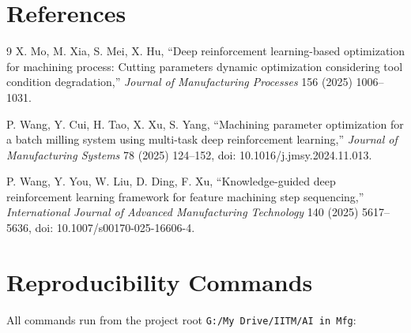 \documentclass[11pt,a4paper]{article}
\begin{document}
\section*{References}
\begin{thebibliography}{9}
X. Mo, M. Xia, S. Mei, X. Hu, ``Deep reinforcement learning-based optimization for machining process: Cutting parameters dynamic optimization considering tool condition degradation,'' \textit{Journal of Manufacturing Processes} 156 (2025) 1006--1031.

P. Wang, Y. Cui, H. Tao, X. Xu, S. Yang, ``Machining parameter optimization for a batch milling system using multi-task deep reinforcement learning,'' \textit{Journal of Manufacturing Systems} 78 (2025) 124--152, doi: 10.1016/j.jmsy.2024.11.013.

P. Wang, Y. You, W. Liu, D. Ding, F. Xu, ``Knowledge-guided deep reinforcement learning framework for feature machining step sequencing,'' \textit{International Journal of Advanced Manufacturing Technology} 140 (2025) 5617--5636, doi: 10.1007/s00170-025-16606-4.
\end{thebibliography}

\appendix
\section{Reproducibility Commands}
\label{app:commands}

All commands run from the project root \texttt{G:/My Drive/IITM/AI in Mfg}:
\end{document}

